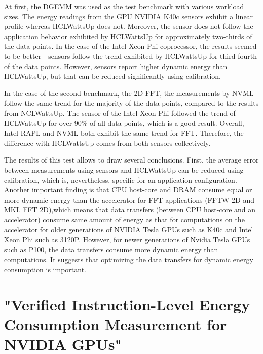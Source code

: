 At first, the DGEMM was used as the test benchmark with various
workload sizes. The energy readings from the GPU NVIDIA K40c
sensors exhibit a linear profile whereas HCLWattsUp does not.
Moreover, the sensor does not follow the application behavior
exhibited by HCLWattsUp for approximately two-thirds of the data
points. In the case of the Intel Xeon Phi coprocessor, the results
seemed to be better - sensors follow the trend exhibited by
HCLWattsUp for third-fourth of the data points. However, sensors
report higher dynamic energy than HCLWattsUp, but that can be
reduced significantly using calibration.

In the case of the second benchmark, the 2D-FFT, the measurements
by NVML follow the same trend for the majority of the data points,
compared to the results from NCLWattsUp. The sensor of the Intel
Xeon Phi followed the trend of HCLWattsUp for over 90\% of all
data points, which is a good result. Overall, Intel RAPL and NVML
both exhibit the same trend for FFT. Therefore, the difference
with HCLWattsUp comes from both sensors collectively.

The results of this test allows to draw several conclusions.
First, the average error between measurements using sensors and
HCLWattsUp can be reduced using calibration, which is,
nevertheless, specific for an application configuration. Another
important finding is that CPU host-core and DRAM consume equal
or more dynamic energy than the accelerator for FFT applications
(FFTW 2D and MKL FFT 2D),which means that data transfers (between
CPU host-core and an accelerator) consume same amount of energy
as that for computations on the accelerator for older generations
of NVIDIA Tesla GPUs such as K40c and Intel Xeon Phi such as 3120P.
However, for newer generations of Nvidia Tesla GPUs such as P100,
the data transfers consume more dynamic energy than computations.
It suggests that optimizing the data transfers for dynamic energy
consumption is important.

\section{"Verified Instruction-Level Energy Consumption Measurement
for NVIDIA GPUs"}

